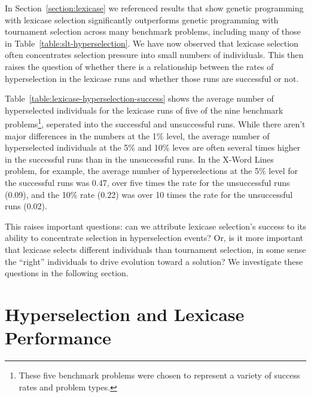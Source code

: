 \documentclass{sig-alternate}
\begin{document}
In Section~\ref{section:lexicase} we referenced results that show genetic programming with lexicase selection significantly outperforms genetic programming with tournament selection across many benchmark problems, including many of those in Table~\ref{table:slt-hyperselection}. We have now observed that lexicase selection often concentrates selection pressure into small numbers of individuals. This then raises the question of whether there is a relationship between the rates of hyperselection in the lexicase runs and whether those runs are successful or not.

Table~\ref{table:lexicase-hyperselection-success} shows the average number of hyperselected individuals for the lexicase runs of five of the nine benchmark problems\footnote{These five benchmark problems were chosen %
to represent a variety of success rates and problem types.}, seperated into the successful and unsuccessful runs. While there aren't major differences in the numbers at the 1\% level, the average number of hyperselected individuals at the 5\% and 10\% leves are often several times higher in the successful runs than in the unsuccessful runs. In the X-Word Lines problem, for example, the average number of hyperselections at the 5\% level for the successful runs was 0.47, over five times the rate for the unsuccessful runs (0.09), and the 10\% rate (0.22) was over 10 times the rate for the unsuccessful runs (0.02).

This raises important questions: can we attribute lexicase selection's success to its ability to concentrate selection in hyperselection events? Or, is it more important that lexicase selects different individuals than tournament selection, in some sense the ``right'' individuals to drive evolution toward a solution? We investigate these questions in the following section.

\section{Hyperselection and Lexicase\\Performance}
\label{section:HyperSelectionandLexicasePerformance}
\end{document}
